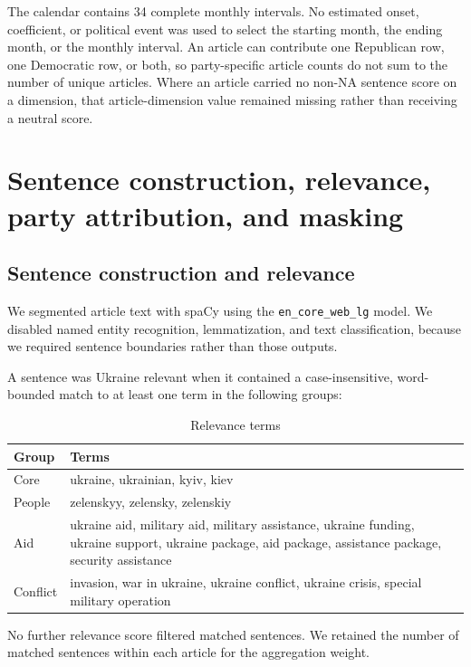 The calendar contains 34 complete monthly intervals. No estimated onset, coefficient, or political event was used to select the starting month, the ending month, or the monthly interval. An article can contribute one Republican row, one Democratic row, or both, so party-specific article counts do not sum to the number of unique articles. Where an article carried no non-NA sentence score on a dimension, that article-dimension value remained missing rather than receiving a neutral score.

\section{Sentence construction, relevance, party attribution, and masking}

\subsection*{Sentence construction and relevance}

We segmented article text with spaCy using the \texttt{en\_core\_web\_lg} model. We disabled named entity recognition, lemmatization, and text classification, because we required sentence boundaries rather than those outputs.

A sentence was Ukraine relevant when it contained a case-insensitive, word-bounded match to at least one term in the following groups:

\begin{table}[htbp]
\centering\small
\caption{Relevance terms}
\begin{tabular}{@{}p{}p{}@{}}
\toprule
\textbf{Group} & \textbf{Terms} \\
\midrule
Core & ukraine, ukrainian, kyiv, kiev \\
People & zelenskyy, zelensky, zelenskiy \\
Aid & ukraine aid, military aid, military assistance, ukraine funding, ukraine support, ukraine package, aid package, assistance package, security assistance \\
Conflict & invasion, war in ukraine, ukraine conflict, ukraine crisis, special military operation \\
\bottomrule
\end{tabular}
\end{table}

No further relevance score filtered matched sentences. We retained the number of matched sentences within each article for the aggregation weight.

